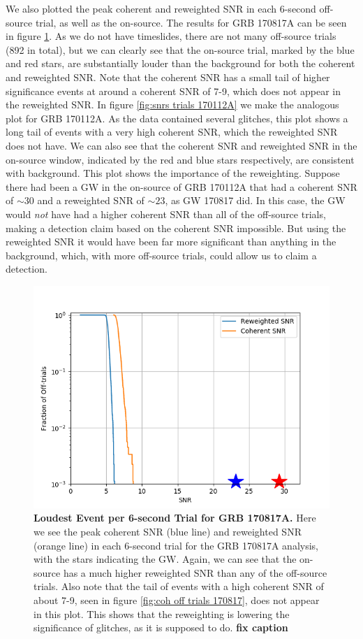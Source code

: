 \documentclass[11pt]{cuthesis}
\begin{document}
We also plotted the peak coherent and reweighted SNR in each 6-second off-source trial, as well as the on-source. The results for GRB 170817A can be seen in figure \ref{fig:snrs trials 170817}. As we do not have timeslides, there are not many off-source trials (892 in total), but we can clearly see that the on-source trial, marked by the blue and red stars, are substantially louder than the background for both the coherent and reweighted SNR. Note that the coherent SNR has a small tail of higher significance events at around a coherent SNR of 7-9, which does not appear in the reweighted SNR. In figure \ref{fig:snrs trials 170112A} we make the analogous plot for GRB 170112A. As the data contained several glitches, this plot shows a long tail of events with a very high coherent SNR, which the reweighted SNR does not have. We can also see that the coherent SNR and reweighted SNR in the on-source window, indicated by the red and blue stars respectively, are consistent with background. This plot shows the importance of the reweighting. Suppose there had been a GW in the on-source of GRB 170112A that had a coherent SNR of $\sim 30$ and a reweighted SNR of $\sim 23$, as GW 170817 did. In this case, the GW would \textit{not} have had a higher coherent SNR than all of the off-source trials, making a detection claim based on the coherent SNR impossible. But using the reweighted SNR it would have been far more significant than anything in the background, which, with more off-source trials, could allow us to claim a detection. 


\begin{figure} %
\begin{center}
\includegraphics[width=0.8\linewidth]{binned_fap_with_signal_170817.png}
\end{center}
\caption{\textbf{Loudest Event per 6-second Trial for GRB 170817A.}  Here we see the peak coherent SNR (blue line) and reweighted SNR (orange line) in each 6-second trial for the GRB 170817A analysis, with the stars indicating the GW. Again, we can see that the on-source has a much higher reweighted SNR than any of the off-source trials. Also note that the tail of events with a high coherent SNR of about 7-9, seen in figure \ref{fig:coh off trials 170817}, does not appear in this plot. This shows that the reweighting is lowering the significance of glitches, as it is supposed to do. \textbf{fix caption}} 
\label{fig:snrs trials 170817}
\end{figure}
\end{document}

